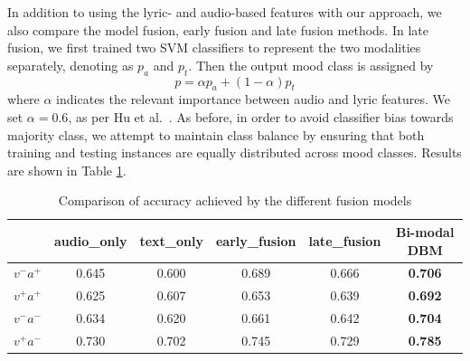 \documentclass{llncs}
\begin{document}
In addition to using the lyric- and audio-based features with our approach, we also compare the model fusion, early fusion and late fusion methods. In late fusion, we first trained two SVM classifiers to represent the two modalities separately, denoting as $p_{a}$ and $p_{t}$. Then the output mood class is assigned by
\begin{equation}
p = \alpha p_{a}+(1-\alpha)p_{t}
\end{equation}
where $\alpha$ indicates the relevant importance between audio and lyric features. We set $\alpha = 0.6$, as per Hu et al.~\cite{Hu2016A}. As before, in order to avoid classifier bias towards majority class, we attempt to maintain class balance by ensuring that both training and testing instances are equally distributed across mood classes. 
Results are shown in Table \ref{tb:multimood-rst}.


\begin{table}[!hpt]
	\centering
	\caption{Comparison of accuracy achieved by the different fusion models}
	\label{tb:multimood-rst}
	\begin{tabular}{|c|c|c|c|c|c|}
		\hline
		& \textbf{audio\_only} & \textbf{text\_only} & \textbf{early\_fusion} & \textbf{late\_fusion} & \textbf{Bi-modal DBM} \\ \hline
		$v^{-}a^{+}$ & 0.645               & 0.600                & 0.689                 & 0.666                & \textbf{0.706}                 \\ \hline
		$v^{+}a^{+}$ & 0.625               & 0.607              & 0.653                 & 0.639                & \textbf{0.692}                 \\ \hline
		$v^{-}a^{-}$ & 0.634               & 0.620               & 0.661                 & 0.642                & \textbf{0.704}                 \\ \hline
		$v^{+}a^{-}$ & 0.730               & 0.702              & 0.745                 & 0.729                & \textbf{0.785}                 \\ \hline
	\end{tabular}
\end{table}
\end{document}
